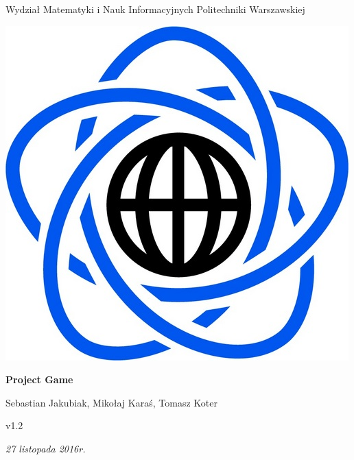 \documentclass[11pt]{article}
\begin{document}
\begin{titlepage}
\centering

{\large Wydział Matematyki i Nauk Informacyjnych Politechniki Warszawskiej}

\vspace{1cm}
\includegraphics[scale=0.15]{../res/logo}
\vspace{3cm}

{\Huge\bfseries Project Game}

\vspace{1cm}

{\Large Sebastian Jakubiak, Mikołaj Karaś, Tomasz Koter}

\vspace{1cm}

{\large v1.2}

\vspace{1cm}

\vfill

{\itshape {\large 27 listopada 2016r.}}
\end{titlepage}

\tableofcontents
\end{document}
